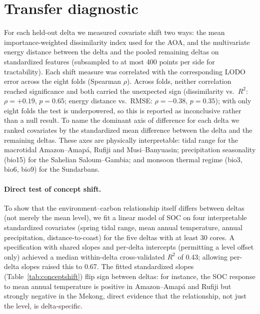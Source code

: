 \documentclass[10pt]{extarticle}
\begin{document}
\begin{table}[h]
\centering
\caption{Per-delta leave-one-delta-out results (gradient boosting, full feature
set). Auto-generated from \texttt{soc\_lodo\_results.json}.}

\end{table}

\section{Transfer diagnostic}
For each held-out delta we measured covariate shift two ways: the mean
importance-weighted dissimilarity index used for the AOA, and the multivariate energy
distance between the delta and the pooled remaining deltas on standardized features
(subsampled to at most 400 points per side for tractability). Each shift measure was
correlated with the corresponding LODO error across the eight folds (Spearman $\rho$).
Across folds, neither correlation reached significance and both carried the unexpected
sign (dissimilarity vs.\ $R^2$: $\rho=+0.19$, $p=0.65$; energy distance vs.\ RMSE:
$\rho=-0.38$, $p=0.35$); with only eight folds the test is underpowered, so this is
reported as inconclusive rather than a null result. To name the dominant axis of
difference for each delta we ranked covariates by the standardized mean difference
between the delta and the remaining deltas. These axes are physically interpretable:
tidal range for the macrotidal Amazon--Amap\'a, Rufiji and Musi--Banyuasin; precipitation
seasonality (bio15) for the Sahelian Saloum--Gambia; and monsoon thermal regime (bio3,
bio6, bio9) for the Sundarbans.

\paragraph{Direct test of concept shift.} To show that the environment--carbon
relationship itself differs between deltas (not merely the mean level), we fit a linear
model of SOC on four interpretable standardized covariates (spring tidal range, mean
annual temperature, annual precipitation, distance-to-coast) for the five deltas with at
least 30 cores. A specification with shared slopes and per-delta intercepts (permitting a
level offset only) achieved a median within-delta cross-validated $R^2$ of 0.43; allowing
per-delta slopes raised this to 0.67. The fitted standardized slopes
(Table~\ref{tab:conceptshift}) flip sign between deltas: for instance, the SOC response
to mean annual temperature is positive in Amazon--Amap\'a and Rufiji but strongly negative in the Mekong, direct evidence that the relationship, not just the level, is
delta-specific.
\end{document}
